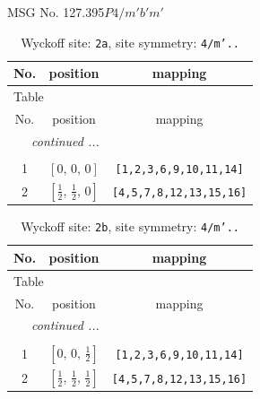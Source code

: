 \documentclass[fleqn,8pt]{jsarticle}
\begin{document}
\setcounter{MaxMatrixCols}{32}

\renewcommand{\tablename}{Table~}
\renewcommand{\figurename}{Figure~}
\begin{center}
\LARGE
MSG No. 127.395\quad$P4/m'b'm'$
\end{center}
\renewcommand{\arraystretch}{1.2}
\begin{longtable}{ccc}
\caption{Wyckoff site: {\tt 2a}, site symmetry: {\tt 4/m'..}}
 \\
 \hline \hline
No. & position & mapping \\ \hline \endfirsthead

\multicolumn{2}{l}{\tablename\ \thetable{}} \\
 \hline \hline
No. & position & mapping \\ \hline \endhead

 \hline \hline
\multicolumn{2}{r}{\footnotesize\it continued ...} \\ \endfoot

 \hline \hline
\multicolumn{2}{r}{} \\ \endlastfoot

1 & $\left[ 0,\, 0,\, 0 \right]$ & {\tt [1,2,3,6,9,10,11,14]} \\ \hline
2 & $\left[ \frac{1}{2},\, \frac{1}{2},\, 0 \right]$ & {\tt [4,5,7,8,12,13,15,16]} \\
\end{longtable}
\renewcommand{\arraystretch}{1.2}
\begin{longtable}{ccc}
\caption{Wyckoff site: {\tt 2b}, site symmetry: {\tt 4/m'..}}
 \\
 \hline \hline
No. & position & mapping \\ \hline \endfirsthead

\multicolumn{2}{l}{\tablename\ \thetable{}} \\
 \hline \hline
No. & position & mapping \\ \hline \endhead

 \hline \hline
\multicolumn{2}{r}{\footnotesize\it continued ...} \\ \endfoot

 \hline \hline
\multicolumn{2}{r}{} \\ \endlastfoot

1 & $\left[ 0,\, 0,\, \frac{1}{2} \right]$ & {\tt [1,2,3,6,9,10,11,14]} \\ \hline
2 & $\left[ \frac{1}{2},\, \frac{1}{2},\, \frac{1}{2} \right]$ & {\tt [4,5,7,8,12,13,15,16]} \\
\end{longtable}
\end{document}
